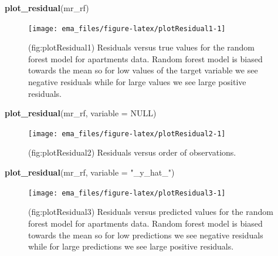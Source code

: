 \documentclass[12pt,]{krantz}
\newenvironment{Shaded}{\begin{snugshade}}{\end{snugshade}}
\newcommand{\DataTypeTok}[1]{\textcolor[rgb]{0.13,0.29,0.53}{#1}}
\newcommand{\KeywordTok}[1]{\textcolor[rgb]{0.13,0.29,0.53}{\textbf{#1}}}
\newcommand{\NormalTok}[1]{#1}
\newcommand{\OtherTok}[1]{\textcolor[rgb]{0.56,0.35,0.01}{#1}}
\newcommand{\StringTok}[1]{\textcolor[rgb]{0.31,0.60,0.02}{#1}}
\begin{document}
\begin{Shaded}
\begin{Highlighting}[]
\KeywordTok{plot_residual}\NormalTok{(mr_rf)}
\end{Highlighting}
\end{Shaded}

\begin{figure}

{\centering \texttt{[image: ema\_files/figure-latex/plotResidual1-1]} 

}

\caption{(fig:plotResidual1) Residuals versus true values for the random forest model for apartments data. Random forest model is biased towards the mean so for low values of the target variable we see negative residuals while for large values we see large positive residuals.}\label{fig:plotResidual1}
\end{figure}

\begin{Shaded}
\begin{Highlighting}[]
\KeywordTok{plot_residual}\NormalTok{(mr_rf, }\DataTypeTok{variable =} \OtherTok{NULL}\NormalTok{)}
\end{Highlighting}
\end{Shaded}

\begin{figure}

{\centering \texttt{[image: ema\_files/figure-latex/plotResidual2-1]} 

}

\caption{(fig:plotResidual2) Residuals versus order of observations. }\label{fig:plotResidual2}
\end{figure}

\begin{Shaded}
\begin{Highlighting}[]
\KeywordTok{plot_residual}\NormalTok{(mr_rf, }\DataTypeTok{variable =} \StringTok{"_y_hat_"}\NormalTok{)}
\end{Highlighting}
\end{Shaded}

\begin{figure}

{\centering \texttt{[image: ema\_files/figure-latex/plotResidual3-1]} 

}

\caption{(fig:plotResidual3) Residuals versus predicted values for the random forest model for apartments data. Random forest model is biased towards the mean so for low predictions we see negative residuals while for large predictions we see large positive residuals.}\label{fig:plotResidual3}
\end{figure}
\end{document}
